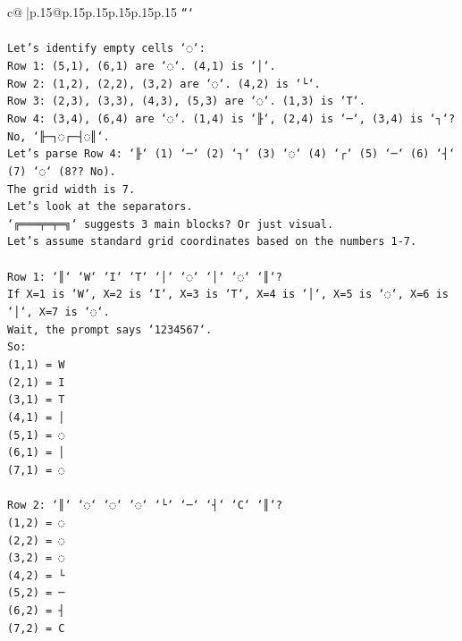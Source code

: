 \documentclass{article}
\begin{document}
{\begin{supertabular}{c@{$\;$}|p{.15\linewidth}@{}p{.15\linewidth}p{.15\linewidth}p{.15\linewidth}p{.15\linewidth}p{.15\linewidth}}
{{{\texttt{```} \\
\\ 
\texttt{Let's identify empty cells `◌`:} \\
\texttt{Row 1: (5,1), (6,1) are `◌`. (4,1) is `│`.} \\
\texttt{Row 2: (1,2), (2,2), (3,2) are `◌`. (4,2) is `└`.} \\
\texttt{Row 3: (2,3), (3,3), (4,3), (5,3) are `◌`. (1,3) is `T`.} \\
\texttt{Row 4: (3,4), (6,4) are `◌`. (1,4) is `╟`, (2,4) is `─`, (3,4) is `┐`? No, `╟─┐◌┌─┤◌║`.} \\
\texttt{Let's parse Row 4: `╟` (1) `─` (2) `┐` (3) `◌` (4) `┌` (5) `─` (6) `┤` (7) `◌` (8?? No).} \\
\texttt{The grid width is 7.} \\
\texttt{Let's look at the separators.} \\
\texttt{`╔═══╤═╤═╗` suggests 3 main blocks? Or just visual.} \\
\texttt{Let's assume standard grid coordinates based on the numbers 1{-}7.} \\
\\ 
\texttt{Row 1: `║` `W` `I` `T` `│` `◌` `│` `◌` `║`?} \\
\texttt{If X=1 is `W`, X=2 is `I`, X=3 is `T`, X=4 is `│`, X=5 is `◌`, X=6 is `│`, X=7 is `◌`.} \\
\texttt{Wait, the prompt says `1234567`.} \\
\texttt{So:} \\
\texttt{(1,1) = W} \\
\texttt{(2,1) = I} \\
\texttt{(3,1) = T} \\
\texttt{(4,1) = │} \\
\texttt{(5,1) = ◌} \\
\texttt{(6,1) = │} \\
\texttt{(7,1) = ◌} \\
\\ 
\texttt{Row 2: `║` `◌` `◌` `◌` `└` `─` `┤` `C` `║`?} \\
\texttt{(1,2) = ◌} \\
\texttt{(2,2) = ◌} \\
\texttt{(3,2) = ◌} \\
\texttt{(4,2) = └} \\
\texttt{(5,2) = ─} \\
\texttt{(6,2) = ┤} \\
\texttt{(7,2) = C} \\
\\ 
}}}
\end{supertabular}}
\end{document}
